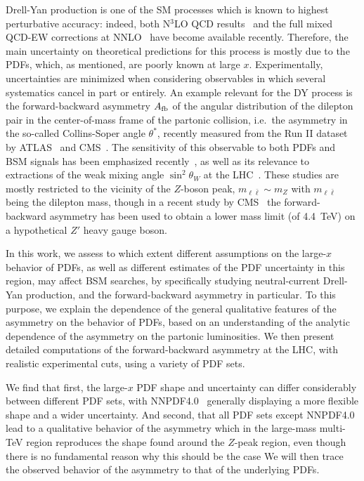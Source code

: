 Drell-Yan production
is one of the SM processes which is known to highest perturbative
accuracy: indeed, both N$^3$LO QCD results~\cite{Duhr:2021vwj}
and the full mixed QCD-EW corrections at NNLO~\cite{Buccioni:2020cfi,Buccioni:2022kgy,Bonciani:2020tvf,Bonciani:2021zzf,Armadillo:2022bgm}
have become available recently.
%
Therefore, the main uncertainty on
theoretical predictions for this process is mostly due to the
PDFs, which, as mentioned, are poorly known at large $x$.
%
Experimentally, uncertainties are minimized when considering
observables in which several systematics cancel in part or entirely.
%
An example relevant for the DY process is the forward-backward asymmetry $A_{\rm fb}$ of the
angular distribution of the dilepton pair in the center-of-mass frame
of the partonic collision, i.e.\ the asymmetry in the
so-called Collins-Soper angle $\theta^*$, recently
measured from the Run II dataset by ATLAS~\cite{ATLAS:2017rue} and CMS~\cite{CMS:2022uul}.
%
The sensitivity of this observable to both PDFs and BSM signals has
been emphasized recently~\cite{Fiaschi:2021sin,Fiaschi:2021okg,Accomando:2019vqt,Accomando:2018nig},
as well as its relevance to extractions of the weak mixing angle
$\sin^2\theta_W$ at the LHC~\cite{CMS:2018ktx}.
These studies  are mostly restricted to the vicinity of the $Z$-boson
peak, $m_{\ell\bar{\ell}} \sim m_Z$ with $m_{\ell\bar{\ell}}$ being the dilepton mass, though in
 a recent study by CMS~\cite{CMS:2022uul} the forward-backward asymmetry has been used
to obtain a lower mass limit
(of 4.4~TeV) on a hypothetical $Z'$ heavy gauge boson.

In this work, we assess to which extent  different assumptions on the large-$x$ behavior of PDFs, as well as different
estimates of the PDF uncertainty in this region, may affect BSM searches,
by specifically studying neutral-current Drell-Yan production, and
the forward-backward asymmetry in particular. To this purpose, we 
explain the dependence of the general
qualitative features of the asymmetry   on the
behavior of PDFs, based on an understanding of the analytic dependence
of the asymmetry on the partonic luminosities.
%
We then present
detailed computations of the forward-backward asymmetry at the LHC, with realistic experimental
cuts, using a variety of PDF sets.

We find that first, the large-$x$ PDF shape and uncertainty can differ
considerably between different PDF sets, with
NNPDF4.0~\cite{Ball:2021leu} generally displaying a more flexible shape
and a wider uncertainty.
%
And second, that all PDF sets except NNPDF4.0 lead to a qualitative
behavior
of the asymmetry which in the large-mass
multi-TeV region reproduces the shape found around the $Z$-peak
region, even though there is no fundamental reason why this should be
the case
%
We will then trace the observed behavior of the asymmetry to that of the
underlying PDFs.

